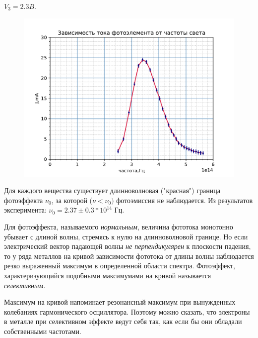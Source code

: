 $V_3= 2.3 B.$
\begin{figure}[H]
	\centering
	\includegraphics[scale=1]{scripts/z2.pdf}
	\caption{}
	\label{fig:5}
\end{figure}

Для каждого вещества существует длинноволновая ("красная") граница фотоэффекта $\nu_0$, за которой ($\nu < \nu_0)$ фотоэмиссия не наблюдается. Из результатов эксперимента: $\nu_0=2.37\pm 0.3*10^{14} \text{ Гц}$.

Для фотоэффекта, называемого {\itshape{нормальным}}, величина фототока монотонно убывает с длиной волны, стремясь к нулю на длинноволновой границе. Но если электрический вектор падающей волны {\itshape{не перпендикулярен}} к плоскости падения, то у ряда металлов на кривой зависимости фототока от длины волны наблюдается резко выраженный максимум в определенной области спектра. Фотоэффект, характеризующийся подобными максимумами на кривой называется {\itshape{селективным}}. 

Максимум на кривой напоминает резонансный максимум при вынужденных колебаниях гармонического осциллятора. Поэтому можно сказать, что электроны в металле при селективном эффекте ведут себя так, как если бы они обладали собственными частотами.

